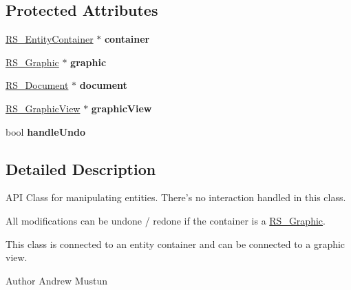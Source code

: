 \subsection*{Protected Attributes}
\begin{DoxyCompactItemize}
\item 
\hypertarget{classRS__Modification_a2f200d9ec9e23a4730781f162d5a8ea0}{\hyperlink{classRS__EntityContainer}{R\-S\-\_\-\-Entity\-Container} $\ast$ {\bfseries container}}\label{classRS__Modification_a2f200d9ec9e23a4730781f162d5a8ea0}

\item 
\hypertarget{classRS__Modification_aaf68d376410943be614018c8a5937a98}{\hyperlink{classRS__Graphic}{R\-S\-\_\-\-Graphic} $\ast$ {\bfseries graphic}}\label{classRS__Modification_aaf68d376410943be614018c8a5937a98}

\item 
\hypertarget{classRS__Modification_a194c1925378b75e17d89ed1d2c7f9122}{\hyperlink{classRS__Document}{R\-S\-\_\-\-Document} $\ast$ {\bfseries document}}\label{classRS__Modification_a194c1925378b75e17d89ed1d2c7f9122}

\item 
\hypertarget{classRS__Modification_a5bd9091df47db2c54615fbd3816048bf}{\hyperlink{classRS__GraphicView}{R\-S\-\_\-\-Graphic\-View} $\ast$ {\bfseries graphic\-View}}\label{classRS__Modification_a5bd9091df47db2c54615fbd3816048bf}

\item 
\hypertarget{classRS__Modification_ab44677f658a572078d79deaa11fa9327}{bool {\bfseries handle\-Undo}}\label{classRS__Modification_ab44677f658a572078d79deaa11fa9327}

\end{DoxyCompactItemize}


\subsection{Detailed Description}
A\-P\-I Class for manipulating entities. There's no interaction handled in this class.

All modifications can be undone / redone if the container is a \hyperlink{classRS__Graphic}{R\-S\-\_\-\-Graphic}.

This class is connected to an entity container and can be connected to a graphic view.

\begin{DoxyAuthor}{Author}
Andrew Mustun 
\end{DoxyAuthor}


